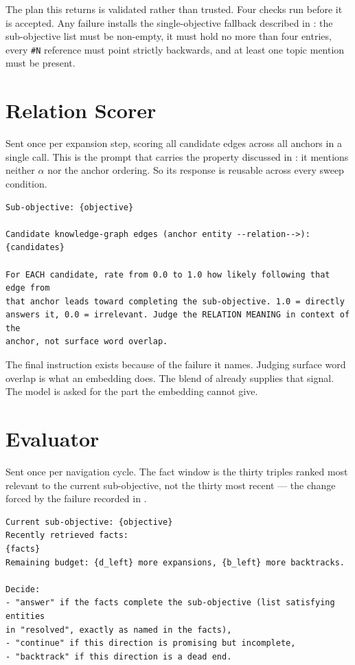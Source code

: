 The plan this returns is validated rather than trusted. Four checks run before
it is accepted. Any failure installs the single-objective fallback described
in : the sub-objective list must be non-empty, it must hold no
more than four entries, every \verb|#N| reference must point strictly backwards,
and at least one topic mention must be present.

\section{Relation Scorer}\label{app:prompt-scorer}

Sent once per expansion step, scoring all candidate edges across all anchors in
a single call. This is the prompt that carries the property discussed in
: it mentions neither $\alpha$ nor the anchor ordering. So its
response is reusable across every sweep condition.

\begin{lstlisting}[style=verbatimblock]
Sub-objective: {objective}

Candidate knowledge-graph edges (anchor entity --relation-->):
{candidates}

For EACH candidate, rate from 0.0 to 1.0 how likely following that edge from
that anchor leads toward completing the sub-objective. 1.0 = directly
answers it, 0.0 = irrelevant. Judge the RELATION MEANING in context of the
anchor, not surface word overlap.
\end{lstlisting}

The final instruction exists because of the failure it names. Judging surface
word overlap is what an embedding does. The blend of 
already supplies that signal. The model is asked for the part the embedding
cannot give.

\section{Evaluator}\label{app:prompt-evaluator}

Sent once per navigation cycle. The fact window is the thirty triples ranked
most relevant to the current sub-objective, not the thirty most recent --- the
change forced by the failure recorded in .

\begin{lstlisting}[style=verbatimblock]
Current sub-objective: {objective}
Recently retrieved facts:
{facts}
Remaining budget: {d_left} more expansions, {b_left} more backtracks.

Decide:
- "answer" if the facts complete the sub-objective (list satisfying entities
in "resolved", exactly as named in the facts),
- "continue" if this direction is promising but incomplete,
- "backtrack" if this direction is a dead end.
\end{lstlisting}


